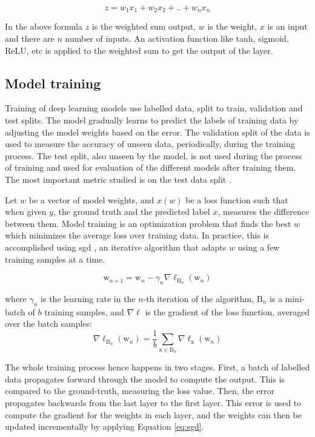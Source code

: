 \[ z = w_1x_1 + w_2x_2 + .. + w_nx_n \]

In the above formula $z$ is the weighted sum output, $w$ is the weight, $x$ is an input and there are $n$ number of inputs. An activation function like tanh, sigmoid, ReLU, etc is applied to the weighted sum to get the output of the layer. 

\subsection{Model training}
Training of deep learning models use labelled data, split to train, validation and test splits. The model gradually learns to predict the labels of training data by adjusting the model weights based on the error. The validation split of the data is used to measure the accuracy of unseen data, periodically, during the training process. The test split, also unseen by the model, is not used during the process of training and used for evaluation of the different models after training them. The
most important metric studied is on the test data split \cite{Koliousis2019CROSSBOW:Servers}.

Let $w$ be a vector of model weights, and $x (w)$ be a loss function such that when given $y$, the ground truth and the predicted label $x$, measures the difference between them. Model training is an optimization problem that finds the best $w$ which minimizes the average loss over training data. In practice, this is accomplished using
\acrfull{sgd} \cite{Robbins1951AMethod}, an iterative algorithm that adapts $w$ using a few training samples at a time.

\begin{equation}
\label{eq:sgd}
\mathrm{w}_{n+1}=\mathrm{w}_{n}-\gamma_{n} \nabla \ell_{\mathrm{B}_{n}}\left(\mathrm{w}_{n}\right)
\end{equation}

where $\gamma_{n}$ is the learning rate in the $n$-th iteration of the algorithm, $\mathrm{B}_{n}$ is a mini-batch of $b$ training samples, and $\nabla \ell$ is the gradient of the loss function, averaged over the batch samples:
$$
\nabla \ell_{\mathrm{B}_{n}}\left(\mathrm{w}_{n}\right)=\frac{1}{b} \sum_{\mathrm{x} \in \mathrm{B}_{n}} \nabla \ell_{\mathrm{x}}\left(\mathrm{w}_{n}\right)
$$

The whole training process hence happens in two stages. First, a batch of labelled data propagates forward through the model to compute the output. This is compared to the ground-truth, measuring the loss value. Then, the error propagates backwards from the last layer to the first layer. This error is used to compute the gradient for the weights in each layer, and the weights can then be updated incrementally by applying Equation \ref{eq:sgd}.

